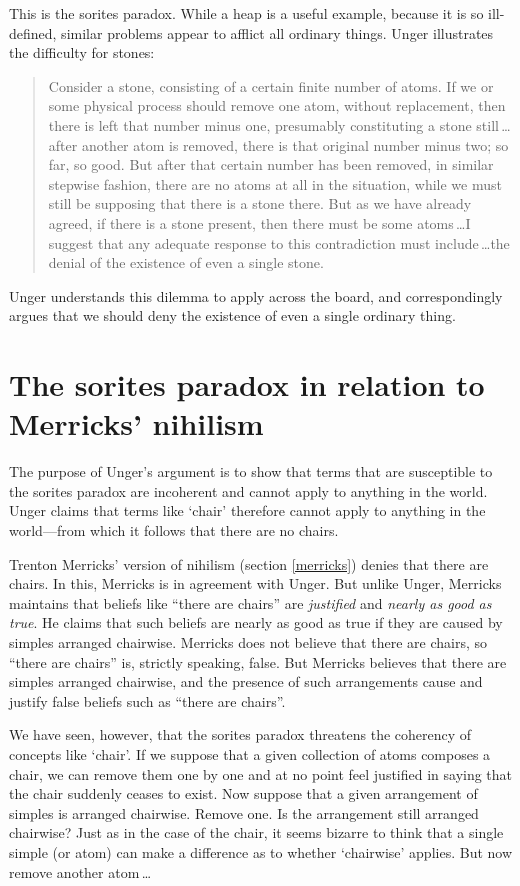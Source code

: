 \documentclass[11pt]{article}
\newenvironment{squote}{%
	\begin{quote}\begin{singlespace}%
	}{%
	\end{singlespace}\end{quote}}
\begin{document}
\begin{spacing}{1.5}
This is the sorites paradox.  While a heap is a useful example,
because it is so ill-defined, similar problems appear to afflict all
ordinary things.  Unger illustrates the difficulty for stones:

\begin{squote}
Consider a stone, consisting of a certain finite number of atoms.  If
we or some physical process should remove one atom, without
replacement, then there is left that number minus one, presumably
constituting a stone still\,\ldots after another atom is removed,
there is that original number minus two; so far, so good.  But after
that certain number has been removed, in similar stepwise fashion,
there are no atoms at all in the situation, while we must still be
supposing that there is a stone there.  But as we have already agreed,
if there is a stone present, then there must be some atoms\,\ldots I
suggest that any adequate response to this contradiction must
include\,\ldots the denial of the existence of even a single
stone.~\citep[121--122]{unger1979}
\end{squote}
Unger understands this dilemma to apply across the board, and
correspondingly argues that we should deny the existence of even a
single ordinary thing.

\section{The sorites paradox in relation to Merricks' nihilism}
\label{sorites-m}
The purpose of Unger's argument is to show that terms that are
susceptible to the sorites paradox are incoherent and cannot apply to
anything in the world.  Unger claims that terms like `chair' therefore
cannot apply to anything in the world---from which it follows that
there are no chairs.

Trenton Merricks' version of nihilism (section \ref{merricks}) denies
that there are chairs.  In this, Merricks is in agreement with Unger.
But unlike Unger, Merricks maintains that beliefs like ``there are
chairs'' are {\em justified} and {\em nearly as good as true}.  He
claims that such beliefs are nearly as good as true if they are caused
by simples arranged chairwise.  Merricks does not believe that there
are chairs, so ``there are chairs'' is, strictly speaking, false.  But
Merricks believes that there are simples arranged chairwise, and the
presence of such arrangements cause and justify false beliefs such as
``there are chairs''.

We have seen, however, that the sorites paradox threatens the
coherency of concepts like `chair'.  If we suppose that a given
collection of atoms composes a chair, we can remove them one by one
and at no point feel justified in saying that the chair suddenly
ceases to exist.  Now suppose that a given arrangement of simples is
arranged chairwise.  Remove one.  Is the arrangement still arranged
chairwise?  Just as in the case of the chair, it seems bizarre to
think that a single simple (or atom) can make a difference as to
whether `chairwise' applies.  But now remove another atom\,\ldots


\end{spacing}
\end{document}
